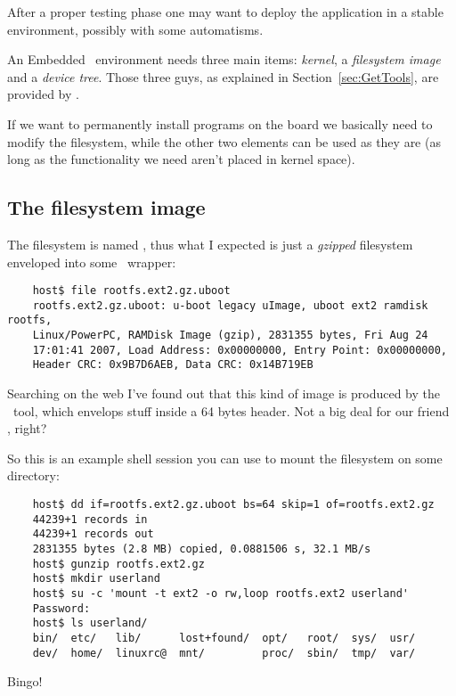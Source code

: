 After a proper testing phase one may want to deploy the application in a
stable environment, possibly with some automatisms.

An Embedded \Linux\ environment needs three main items: \emph{kernel}, a
\emph{filesystem image} and a \emph{device tree}. Those three guys, as
explained in Section~\ref{sec:GetTools}, are provided by
.

If we want to permanently install programs on the board we basically need
to modify the filesystem, while the other two elements can be used as they
are (as long as the functionality we need aren't placed in kernel space).

\subsection{The filesystem image}

    The filesystem is named , thus what I
    expected is just a \emph{gzipped}  filesystem enveloped
    into some \uBoot\ wrapper:

\begin{lstlisting}
    host$ file rootfs.ext2.gz.uboot
    rootfs.ext2.gz.uboot: u-boot legacy uImage, uboot ext2 ramdisk rootfs,
    Linux/PowerPC, RAMDisk Image (gzip), 2831355 bytes, Fri Aug 24
    17:01:41 2007, Load Address: 0x00000000, Entry Point: 0x00000000,
    Header CRC: 0x9B7D6AEB, Data CRC: 0x14B719EB
\end{lstlisting}

    Searching on the web I've found out that this kind of image is
    produced by the \mkimage\ tool, which envelops stuff inside a 64 bytes
    header. Not a big deal for our friend , right?

    So this is an example shell session you can use to mount the
    filesystem on some directory:
\begin{lstlisting}
    host$ dd if=rootfs.ext2.gz.uboot bs=64 skip=1 of=rootfs.ext2.gz
    44239+1 records in
    44239+1 records out
    2831355 bytes (2.8 MB) copied, 0.0881506 s, 32.1 MB/s
    host$ gunzip rootfs.ext2.gz
    host$ mkdir userland
    host$ su -c 'mount -t ext2 -o rw,loop rootfs.ext2 userland'
    Password:
    host$ ls userland/
    bin/  etc/   lib/      lost+found/  opt/   root/  sys/  usr/
    dev/  home/  linuxrc@  mnt/         proc/  sbin/  tmp/  var/
\end{lstlisting}
    Bingo!


